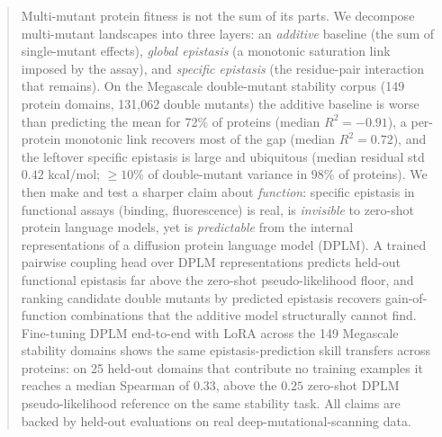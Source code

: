 \documentclass{article}
\begin{document}

\printAffiliationsAndNotice{}

\begin{abstract}
Multi-mutant protein fitness is not the sum of its parts. We decompose
multi-mutant landscapes into three layers: an \emph{additive} baseline (the sum
of single-mutant effects), \emph{global epistasis} (a monotonic saturation link
imposed by the assay), and \emph{specific epistasis} (the residue-pair
interaction that remains). On the Megascale double-mutant stability corpus
(149 protein domains, 131{,}062 double mutants) the additive baseline is worse
than predicting the mean for 72\% of proteins (median $R^2=-0.91$), a per-protein
monotonic link recovers most of the gap (median $R^2=0.72$), and the leftover
specific epistasis is large and ubiquitous (median residual std $0.42$ kcal/mol;
$\geq 10\%$ of double-mutant variance in 98\% of proteins). We then make and test
a sharper claim about \emph{function}: specific epistasis in functional assays
(binding, fluorescence) is real, is \emph{invisible} to zero-shot protein
language models, yet is \emph{predictable} from the internal representations of a
diffusion protein language model (DPLM). A trained pairwise coupling head over
DPLM representations predicts held-out functional epistasis far above the
zero-shot pseudo-likelihood floor, and ranking candidate double mutants by
predicted epistasis recovers gain-of-function combinations that the additive
model structurally cannot find. Fine-tuning DPLM end-to-end with LoRA across the 149 Megascale stability
domains shows the same epistasis-prediction skill transfers across proteins:
on 25 held-out domains that contribute no training examples it reaches a median
Spearman of $0.33$, above the $0.25$ zero-shot DPLM pseudo-likelihood reference on
the same stability task. All claims are backed
by held-out evaluations on real deep-mutational-scanning data.
\end{abstract}
\end{document}
